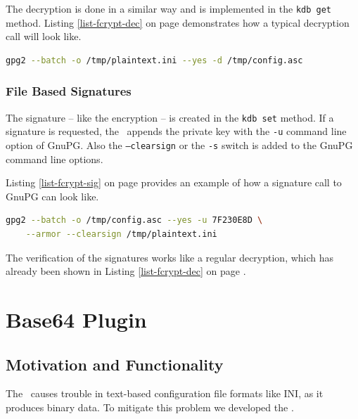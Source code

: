 The decryption is done in a similar way and is implemented in the \texttt{kdb get} method.
Listing \ref{list-fcrypt-dec} on page \pageref{list-fcrypt-dec} demonstrates how a typical decryption call will look like.

\begin{lstlisting}[label=list-fcrypt-dec,language=Bash,caption={Fcrypt: decryption command}]
gpg2 --batch -o /tmp/plaintext.ini --yes -d /tmp/config.asc
\end{lstlisting}

\subsubsection{File Based Signatures}

The signature -- like the encryption -- is created in the \texttt{kdb set} method.
If a signature is requested, the \fcrypt ~appends the private key with the \texttt{-u} command line option of GnuPG.
Also the \texttt{---clearsign} or the \texttt{-s} switch is added to the GnuPG command line options.

Listing \ref{list-fcrypt-sig} on page \pageref{list-fcrypt-sig} provides an example of how a signature call to GnuPG can look like.

\begin{lstlisting}[label=list-fcrypt-sig,language=Bash,caption={Fcrypt: signature command}]
gpg2 --batch -o /tmp/config.asc --yes -u 7F230E8D \
	--armor --clearsign /tmp/plaintext.ini
\end{lstlisting}

The verification of the signatures works like a regular decryption, which has already been shown in Listing \ref{list-fcrypt-dec} on page \pageref{list-fcrypt-dec}.

\section{Base64 Plugin}
\label{base64-plugin}

\subsection{Motivation and Functionality}

The \crypto ~causes trouble in text-based configuration file formats like INI, as it produces binary data.
To mitigate this problem we developed the \base.

